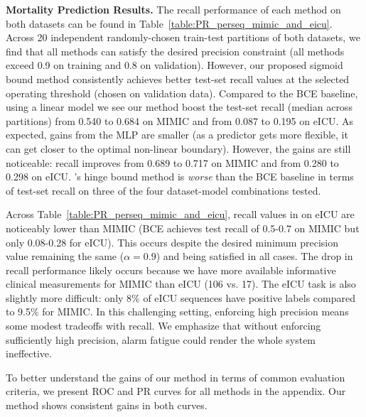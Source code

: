 \textbf{Mortality Prediction Results.}
The recall performance of each method on both datasets can be found in Table~\ref{table:PR_perseq_mimic_and_eicu}.
Across 20 independent randomly-chosen train-test partitions of both datasets, we find that all methods can satisfy the desired precision constraint (all methods exceed 0.9 on training and 0.8 on validation). However, our proposed sigmoid bound method consistently achieves better test-set recall values at the selected operating threshold (chosen on validation data).
Compared to the BCE baseline, using a linear model we see our method boost the test-set recall (median across partitions) from 0.540 to 0.684 on MIMIC and from 0.087 to 0.195 on eICU.
As expected, gains from the MLP are smaller (as a predictor gets more flexible, it can get closer to the optimal non-linear boundary).
However, the gains are still noticeable: recall improves from 0.689 to 0.717 on MIMIC and from 0.280 to 0.298 on eICU.
\citet{ebanScalableLearningNonDecomposable2017}'s hinge bound method is \emph{worse} than the BCE baseline in terms of test-set recall on three of the four dataset-model combinations tested.

Across Table~\ref{table:PR_perseq_mimic_and_eicu}, recall values in on eICU are noticeably lower than MIMIC (BCE achieves test recall of 0.5-0.7 on MIMIC but only 0.08-0.28 for eICU). This occurs despite the desired minimum precision value remaining the same ($\alpha = 0.9$) and being satisfied in all cases.
The drop in recall performance likely occurs because we have more available informative clinical measurements for MIMIC than eICU (106 vs. 17). 
The eICU task is also slightly more difficult: only 8\% of eICU sequences have positive labels compared to 9.5\% for MIMIC. 
In this challenging setting, enforcing high precision means some modest tradeoffs with recall. We emphasize that without enforcing sufficiently high precision, alarm fatigue could render the whole system ineffective.



To better understand the gains of our method in terms of common evaluation criteria, we present ROC and PR curves for all methods in the appendix. Our method shows consistent gains in both curves.


